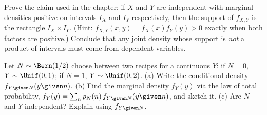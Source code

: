 \begin{exercise}
\label{ch13:ex-proof-support}
Prove the claim used in the chapter: if $X$ and $Y$ are independent with marginal
densities positive on intervals $I_X$ and $I_Y$ respectively, then the support of
$f_{X,Y}$ is the rectangle $I_X\times I_Y$. (Hint: $f_{X,Y}(x,y)=f_X(x)f_Y(y)>0$
exactly when both factors are positive.) Conclude that any joint density whose
support is \emph{not} a product of intervals must come from dependent variables.
\end{exercise}

\begin{exercise}
\label{ch13:ex-mixed}
Let $N\sim\Bern(1/2)$ choose between two recipes for a continuous $Y$: if $N=0$,
$Y\sim\Unif(0,1)$; if $N=1$, $Y\sim\Unif(0,2)$. (a) Write the conditional density
$f_{Y\given N}(y\given n)$. (b) Find the marginal density $f_Y(y)$ via the law of
total probability, $f_Y(y)=\sum_n p_N(n)\,f_{Y\given N}(y\given n)$, and sketch
it. (c) Are $N$ and $Y$ independent? Explain using $f_{Y\given N}$.
\end{exercise}
